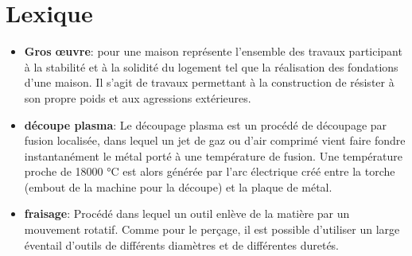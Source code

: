 \newpage
{}

\printglossary[type=\acronymtype]
\label{sec:acronymes}
\setcounter{secnumdepth}{0}
\section{Lexique}
\begin{itemize}
    \item \textbf{Gros œuvre}: pour une maison représente l'ensemble des travaux participant à la stabilité et à la solidité du logement tel que la réalisation des fondations d'une maison. Il s'agit de travaux permettant à la construction de résister à son propre poids et aux agressions extérieures.
    \item \textbf{découpe plasma}: Le découpage plasma est un procédé de découpage par fusion localisée, dans lequel un jet de gaz ou d’air comprimé vient faire fondre instantanément le métal porté à une température de fusion. Une température proche de 18000 °C est alors générée par l'arc électrique créé entre la torche (embout de la machine pour la découpe) et la plaque de métal.
    \item \textbf{fraisage}: Procédé dans lequel un outil enlève de la matière par un mouvement rotatif. Comme pour le perçage, il est possible d'utiliser un large éventail d'outils de différents diamètres et de différentes duretés.
\end{itemize}
